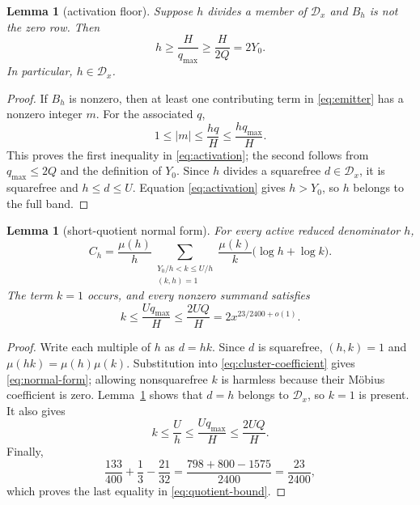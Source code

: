 \documentclass[11pt]{article}
\newtheorem{lemma}[theorem]{Lemma}
\theoremstyle{definition}
\theoremstyle{remark}
\newcommand{\Dd}{\mathcal D}
\begin{document}
\begin{lemma}[activation floor]
\label{lem:activation}
Suppose $h$ divides a member of $\Dd_x$ and $B_h$ is not the zero row.  Then
\begin{equation}
 h\ge\frac{H}{q_{\max}}
 \ge\frac{H}{2Q}=2Y_0.
 \label{eq:activation}
\end{equation}
In particular, $h\in\Dd_x$.
\end{lemma}

\begin{proof}
If $B_h$ is nonzero, then at least one contributing term in
\eqref{eq:emitter} has a nonzero integer $m$.  For the associated $q$,
\[
 1\le |m|\le\frac{hq}{H}\le\frac{hq_{\max}}{H}.
\]
This proves the first inequality in \eqref{eq:activation}; the second follows
from $q_{\max}\le2Q$ and the definition of $Y_0$.  Since $h$ divides a
squarefree $d\in\Dd_x$, it is squarefree and $h\le d\le U$.  Equation
\eqref{eq:activation} gives $h>Y_0$, so $h$ belongs to the full band.
\end{proof}

\begin{lemma}[short-quotient normal form]
\label{lem:normal-form}
For every active reduced denominator $h$,
\begin{equation}
 C_h=\frac{\mu(h)}{h}
 \sum_{\substack{Y_0/h<k\le U/h\\(k,h)=1}}
 \frac{\mu(k)}{k}\bigl(\log h+\log k\bigr).
 \label{eq:normal-form}
\end{equation}
The term $k=1$ occurs, and every nonzero summand satisfies
\begin{equation}
 k\le\frac{Uq_{\max}}{H}
 \le\frac{2UQ}{H}
 =2x^{23/2400+o(1)}.
 \label{eq:quotient-bound}
\end{equation}
\end{lemma}

\begin{proof}
Write each multiple of $h$ as $d=hk$.  Since $d$ is squarefree,
$(h,k)=1$ and $\mu(hk)=\mu(h)\mu(k)$.  Substitution into
\eqref{eq:cluster-coefficient} gives \eqref{eq:normal-form}; allowing
nonsquarefree $k$ is harmless because their M\"obius coefficient is zero.
Lemma~\ref{lem:activation} shows that $d=h$ belongs to $\Dd_x$, so $k=1$
is present.  It also gives
\[
 k\le\frac Uh\le\frac{Uq_{\max}}H\le\frac{2UQ}H.
\]
Finally,
\[
 \frac{133}{400}+\frac13-\frac{21}{32}
 =\frac{798+800-1575}{2400}
 =\frac{23}{2400},
\]
which proves the last equality in \eqref{eq:quotient-bound}.
\end{proof}
\end{document}
